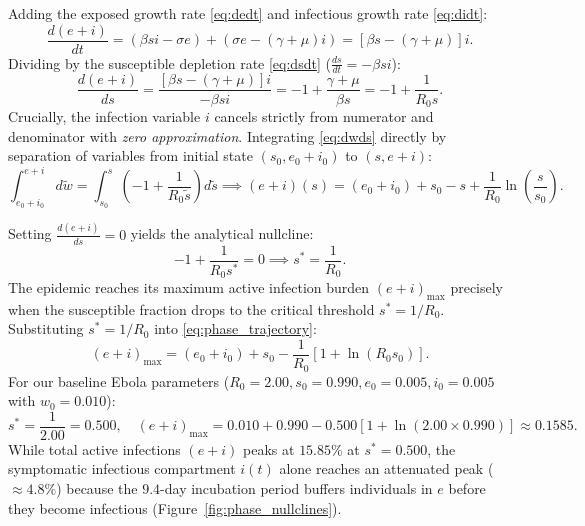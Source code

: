 \documentclass[11pt,a4paper]{article}
\begin{document}
Adding the exposed growth rate \eqref{eq:dedt} and infectious growth rate \eqref{eq:didt}:
\begin{equation}
    \frac{d(e+i)}{dt} = \left(\beta s i - \sigma e\right) + \left(\sigma e - (\gamma + \mu)i\right) = \left[\beta s - (\gamma + \mu)\right]i.
    \label{eq:dwdt}
\end{equation}
Dividing by the susceptible depletion rate \eqref{eq:dsdt} ($\frac{ds}{dt} = -\beta s i$):
\begin{equation}
    \frac{d(e+i)}{ds} = \frac{\left[\beta s - (\gamma + \mu)\right]i}{-\beta s i} = -1 + \frac{\gamma + \mu}{\beta s} = -1 + \frac{1}{R_0 s}.
    \label{eq:dwds}
\end{equation}
Crucially, the infection variable $i$ cancels strictly from numerator and denominator with \emph{zero approximation}. Integrating \eqref{eq:dwds} directly by separation of variables from initial state $(s_0, e_0 + i_0)$ to $(s, e + i)$:
\begin{equation}
    \int_{e_0+i_0}^{e+i} d\tilde{w} = \int_{s_0}^s \left(-1 + \frac{1}{R_0 \tilde{s}}\right) d\tilde{s} \implies (e+i)(s) = (e_0 + i_0) + s_0 - s + \frac{1}{R_0} \ln\left(\frac{s}{s_0}\right).
    \label{eq:phase_trajectory}
\end{equation}

Setting $\frac{d(e+i)}{ds} = 0$ yields the analytical nullcline:
\begin{equation}
    -1 + \frac{1}{R_0 s^*} = 0 \implies s^* = \frac{1}{R_0}.
    \label{eq:nullcline}
\end{equation}
The epidemic reaches its maximum active infection burden $(e+i)_{\max}$ precisely when the susceptible fraction drops to the critical threshold $s^* = 1/R_0$. Substituting $s^* = 1/R_0$ into \eqref{eq:phase_trajectory}:
\begin{equation}
    (e+i)_{\max} = (e_0 + i_0) + s_0 - \frac{1}{R_0} \left[1 + \ln(R_0 s_0)\right].
    \label{eq:imax}
\end{equation}
For our baseline Ebola parameters ($R_0 = 2.00, s_0 = 0.990, e_0 = 0.005, i_0 = 0.005$ with $w_0 = 0.010$):
\begin{equation}
    s^* = \frac{1}{2.00} = 0.500, \quad (e+i)_{\max} = 0.010 + 0.990 - 0.500 \left[1 + \ln(2.00 \times 0.990)\right] \approx 0.1585.
\end{equation}
While total active infections $(e+i)$ peaks at $15.85\%$ at $s^* = 0.500$, the symptomatic infectious compartment $i(t)$ alone reaches an attenuated peak ($\approx 4.8\%$) because the $9.4$-day incubation period buffers individuals in $e$ before they become infectious (Figure~\ref{fig:phase_nullclines}).
\end{document}
